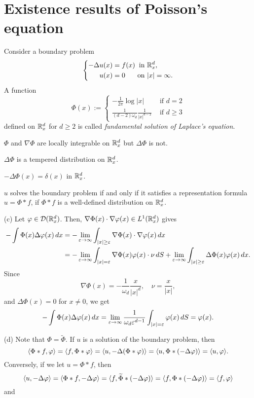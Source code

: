 \documentclass{../note}
\begin{document}
\section{Existence results of Poisson's equation}
\begin{prb}
Consider a boundary problem
\[\left\{\begin{alignedat}{2}
-\Delta u(x)&=f(x) & \text{ in }&\mathbb{R}_x^d,\\
u(x)&=0 & \text{ on }&|x|=\infty.
\end{alignedat}\right.\]
A function
\[\Phi(x):=\begin{cases}-\frac1{2\pi}\log|x|&\text{ if }d=2\\\frac1{(d-2)\omega_d}\frac1{|x|^{d-2}}&\text{ if }d\ge3\end{cases}\]
defined on $\mathbb{R}_x^d$ for $d\ge2$ is called \emph{fundamental solution of Laplace's equation}.
\begin{parts}
\item $\Phi$ and $\nabla\Phi$ are locally integrable on $\mathbb{R}_x^d$ but $\Delta\Phi$ is not.
\item $\Delta\Phi$ is a tempered distribution on $\mathbb{R}_x^d$.
\item $-\Delta\Phi(x)=\delta(x)$ in $\mathbb{R}_x^d$.
\item $u$ solves the boundary problem if and only if it satisfies a representation formula $u=\Phi*f$, if $\Phi*f$ is a well-defined distribution on $\mathbb{R}_x^d$.
\end{parts}
\end{prb}
\begin{pf}
(c)
Let $\varphi\in\mathcal{D}(\mathbb{R}_x^d)$.
Then, $\nabla\Phi(x)\cdot\nabla\varphi(x)\in L^1(\mathbb{R}_x^d)$ gives
\begin{align*}
-\int\Phi(x)\Delta\varphi(x)\,dx
&=-\lim_{\varepsilon\to\infty}\int_{|x|\ge\varepsilon}\nabla\Phi(x)\cdot\nabla\varphi(x)\,dx\\
&=-\lim_{\varepsilon\to\infty}\int_{|x|=\varepsilon}\nabla\Phi(x)\varphi(x)\cdot\nu\,dS
+\lim_{\varepsilon\to\infty}\int_{|x|\ge\varepsilon}\Delta\Phi(x)\varphi(x)\,dx.
\end{align*}
Since
\[\nabla\Phi(x)=-\frac1{\omega_d}\frac x{|x|^d},\quad\nu=\frac x{|x|},\]
and $\Delta\Phi(x)=0$ for $x\ne0$, we get
\[-\int\Phi(x)\Delta\varphi(x)\,dx=\lim_{\varepsilon\to\infty}\frac1{\omega_d\varepsilon^{d-1}}\int_{|x|=\varepsilon}\varphi(x)\,dS=\varphi(x).\]

(d)
Note that $\Phi=\tilde\Phi$.
If $u$ is a solution of the boundary problem, then
\[\langle\Phi*f,\varphi\rangle=\langle f,\Phi*\varphi\rangle=\langle u,-\Delta(\Phi*\varphi)\rangle=\langle u,\Phi*(-\Delta\varphi)\rangle=\langle u,\varphi\rangle.\]
Conversely, if we let $u=\Phi*f$, then
\[\langle u,-\Delta\varphi\rangle=\langle\Phi*f,-\Delta\varphi\rangle=\langle f,\widetilde\Phi*(-\Delta\varphi)\rangle=\langle f,\Phi*(-\Delta\varphi)\rangle=\langle f,\varphi\rangle\]
and %
\end{pf}
\end{document}
